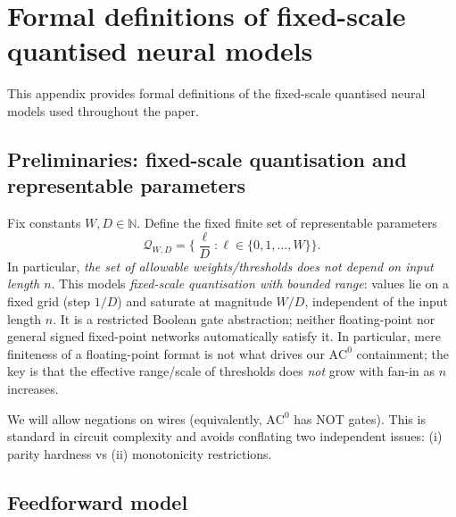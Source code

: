 \documentclass[11pt]{article}
\newcommand{\AC}{\mathrm{AC}}
\newcommand{\N}{\mathbb{N}}
\newcommand{\Qset}{\mathcal{Q}}
\theoremstyle{plain}
\theoremstyle{definition}
\theoremstyle{remark}
\numberwithin{equation}{section}
\begin{document}
\appendix

\section{Formal definitions of fixed-scale quantised neural models}
\label{app:defs}

This appendix provides formal definitions of the fixed-scale quantised neural models used throughout the paper.

\subsection{Preliminaries: fixed-scale quantisation and representable parameters}
\label{app:precision}

Fix constants $W,D\in\N$.
Define the fixed finite set of representable parameters
\[
\Qset_{W,D}=\Big\{\frac{\ell}{D}: \ell\in\{0,1,\dots,W\}\Big\}.
\]
In particular, \emph{the set of allowable weights/thresholds does not depend on input length $n$}.
This models \emph{fixed-scale quantisation with bounded range}: values lie on a fixed grid (step $1/D$) and saturate at magnitude $W/D$, independent of the input length $n$.
It is a restricted Boolean gate abstraction; neither floating-point nor general signed fixed-point networks automatically satisfy it.
In particular, mere finiteness of a floating-point format is not what drives our $\AC^0$ containment; the key is that the effective range/scale of thresholds does \emph{not} grow with fan-in as $n$ increases.

We will allow negations on wires (equivalently, $\AC^0$ has NOT gates). This is standard in circuit complexity and avoids conflating two independent issues: (i) parity hardness vs (ii) monotonicity restrictions.

\subsection{Feedforward model}
\label{app:NN}
\end{document}

